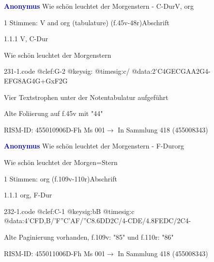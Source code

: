 \documentclass[twocolumn]{book}
\begin{document}
\par \vspace{7pt} \textcolor{darkblue}{\textbf{Anonymus  }}\hfillplus{\textbf{[231]}}\newline Wie schön leuchtet der Morgenstern - C-Dur\newline V, org
\par \begin{itshape}\end{itshape} 
\par \textcolor{darkblue}{}  1 Stimmen: V and org (tabulature)  (f.45v-48r)\newline Abschrift
\par 1.1.1  V, C-Dur\newline \begin{footnotesize} Wie schön leuchtet der Morgenstern \end{footnotesize}  
\begin{filecontents*}{231-1.code}
@clef:G-2
@keysig:
@timesig:c/
@data:2'C4GECGAA2G4-EFG{8AG}4G+GxF2G
\end{filecontents*}
\newline
%
\par Vier Textstrophen unter der Notentabulatur aufgeführt
\par Alte Foliierung auf f.45v mit "44"
\par RISM-ID: 455010906\newline D-Fh  Ms 001\newline $\rightarrow$ In Sammlung 418 (455008343)
      
\par \vspace{7pt} \textcolor{darkblue}{\textbf{Anonymus  }}\hfillplus{\textbf{[232]}}\newline Wie schön leuchtet der Morgenstern - F-Dur\newline org
\par \begin{itshape}[f.109v, heading:] Wie schön leuchtet der Morgen=Stern\end{itshape} 
\par \textcolor{darkblue}{}  1 Stimmen: org  (f.109v-110r)\newline Abschrift
\par 1.1.1  org, F-Dur  
\begin{filecontents*}{232-1.code}
@clef:C-1
@keysig:bB
@timesig:c
@data:4'CFD,B/'F''C'AF/''C{8.6DD}2C/4-CDE/4.8FEDC/2C4-
\end{filecontents*}
\newline
%
\par Alte Paginierung vorhanden, f.109v: "85" und f.110r: "86"
\par RISM-ID: 455011006\newline D-Fh  Ms 001\newline $\rightarrow$ In Sammlung 418 (455008343)
      
\end{document}
